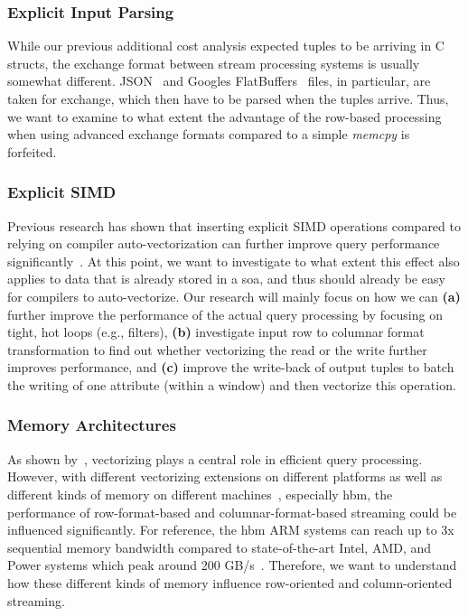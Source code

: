 \subsubsection{Explicit Input Parsing}
While our previous additional cost analysis expected tuples to be arriving in C structs, the exchange format between stream processing systems is usually somewhat different.
JSON~\cite{DBLP:journals/pvldb/PalkarABZ18,DBLP:journals/vldb/LangdaleL19,DBLP:journals/pvldb/LiKCGK17} and Googles FlatBuffers~\cite{googleflatbuffers} files, in particular, are taken for exchange, which then have to be parsed when the tuples arrive.
Thus, we want to examine to what extent the advantage of the row-based processing when using advanced exchange formats compared to a simple \emph{memcpy} is forfeited.

\subsubsection{Explicit SIMD}

Previous research has shown that inserting explicit SIMD operations compared to relying on compiler auto-vectorization can further improve query performance significantly~\cite{DBLP:journals/pvldb/KerstenLKNPB18}.
At this point, we want to investigate to what extent this effect also applies to data that is already stored in a \ac{soa}, and thus should already be easy for compilers to auto-vectorize.
Our research will mainly focus on how we can \textbf{(a)} further improve the performance of the actual query processing by focusing on tight, hot loops (e.g., filters), \textbf{(b)} investigate input row to columnar format transformation to find out whether vectorizing the read or the write further improves performance, and \textbf{(c)} improve the write-back of output tuples to batch the writing of one attribute (within a window) and then vectorize this operation.
 
\subsubsection{Memory Architectures}

As shown by~\citet{DBLP:journals/pvldb/KerstenLKNPB18}, vectorizing plays a central role in efficient query processing.
However, with different vectorizing extensions on different platforms as well as different kinds of memory on different machines~\cite[]{bollmeier2021processor}, especially \ac{hbm}, the performance of row-format-based and columnar-format-based streaming could be influenced significantly.
For reference, the \ac{hbm} ARM systems can reach up to 3x sequential memory bandwidth compared to state-of-the-art Intel, AMD, and Power systems which peak around 200 GB/s~\cite[]{bollmeier2021processor}.
Therefore, we want to understand how these different kinds of memory influence row-oriented and column-oriented streaming.

